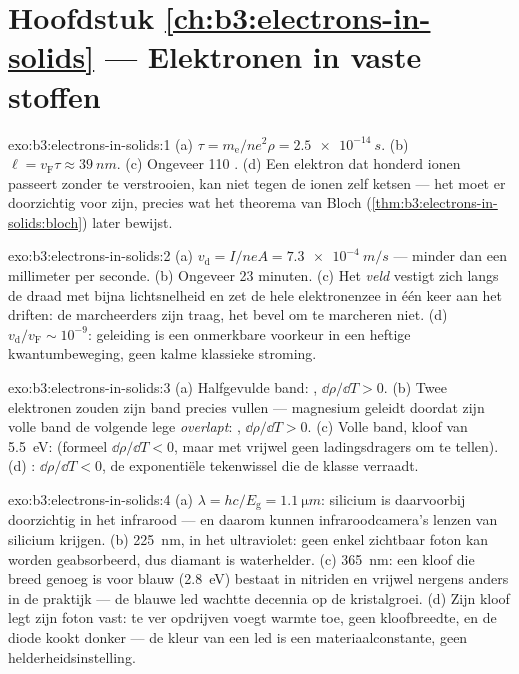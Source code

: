 \section*{Hoofdstuk \ref{ch:b3:electrons-in-solids} --- Elektronen in vaste stoffen}

\begin{solution}{exo:b3:electrons-in-solids:1}
(a) $\tau = m_{\text{e}}/ne^2\rho = \qty{2.5e-14}{s}$. (b) $\ell =
v_{\text{F}}\tau \approx \qty{39}{nm}$. (c) Ongeveer 110
. (d) Een elektron dat honderd ionen passeert zonder
te verstrooien, kan niet tegen de ionen zelf ketsen --- het
 moet er doorzichtig voor zijn, precies wat het theorema van Bloch
(\cref{thm:b3:electrons-in-solids:bloch}) later bewijst.
\end{solution}

\begin{solution}{exo:b3:electrons-in-solids:2}
(a) $v_{\text{d}} = I/neA = \qty{7.3e-4}{m/s}$ --- minder dan een
millimeter per seconde. (b) Ongeveer 23 minuten. (c) Het \emph{veld}
vestigt zich langs de draad met bijna lichtsnelheid en zet
de hele elektronenzee in één keer aan het driften: de marcheerders zijn traag,
het bevel om te marcheren niet. (d) $v_{\text{d}}/v_{\text{F}} \sim
10^{-9}$: geleiding is een onmerkbare voorkeur in een heftige
kwantumbeweging, geen kalme klassieke stroming.
\end{solution}

\begin{solution}{exo:b3:electrons-in-solids:3}
(a) Halfgevulde band: , $\dd\rho/\dd T > 0$. (b) Twee
elektronen zouden zijn band precies vullen --- magnesium geleidt
doordat zijn volle band de volgende lege \emph{overlapt}: ,
$\dd\rho/\dd T > 0$. (c) Volle band, kloof van \qty{5.5}{eV}: 
(formeel $\dd\rho/\dd T < 0$, maar met vrijwel geen ladingsdragers
om te tellen). (d) : $\dd\rho/\dd T < 0$, de
exponentiële tekenwissel die de klasse verraadt.
\end{solution}

\begin{solution}{exo:b3:electrons-in-solids:4}
(a) $\lambda = hc/E_{\text{g}} = \qty{1.1}{\micro m}$: silicium is
daarvoorbij doorzichtig in het infrarood --- en daarom kunnen infraroodcamera's
lenzen van silicium krijgen. (b) \qty{225}{nm}, in het
ultraviolet: geen enkel zichtbaar foton kan worden geabsorbeerd, dus diamant is
waterhelder. (c) \qty{365}{nm}: een kloof die breed genoeg is voor blauw
(\qty{2.8}{eV}) bestaat in nitriden en vrijwel nergens anders in de
praktijk --- de blauwe led wachtte decennia op de kristalgroei.
(d) Zijn kloof legt zijn foton vast: te ver opdrijven voegt warmte toe, geen
kloofbreedte, en de diode kookt donker --- de kleur van een led is een
materiaalconstante, geen helderheidsinstelling.
\end{solution}

